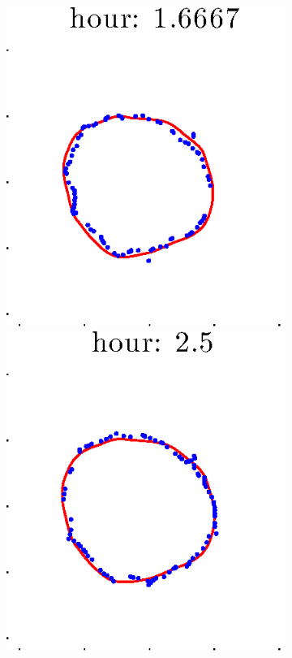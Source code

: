 \documentclass[12pt]{article}
\begin{document}
\begin{figure}[h!]
\begin{subfigure}[b]{.3\textwidth}
		\includegraphics[height=.15\textheight]{Pos5exp2/secondhalf/first3.eps}
		\includegraphics[height=.15\textheight]{Pos5exp2/secondhalf/first4.eps}

\end{subfigure}
\end{figure}
\end{document}
